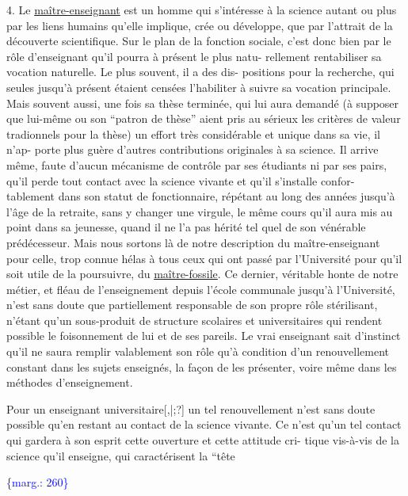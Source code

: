 \documentclass[11pt]{article}
\newcommand{\scanpage}[1]{\par\bigskip\noindent{\small\sffamily[scan #1]}\par}
\newcommand{\mspage}[1]{{\small\sffamily[p.\,#1]}}
\newcommand{\margin}[1]{\textcolor{blue}{\{\textsf{marg.:} #1\}}}
\newcommand{\uline}[1]{\underline{#1}}
\newcommand{\unsure}[1]{[#1?]}
\begin{document}
4.  Le \uline{maître-enseignant} est un homme qui s'intéresse à la science autant ou
plus par les liens humains qu'elle implique, crée ou développe, que par
l'attrait de la découverte scientifique. Sur le plan de la fonction sociale,
c'est donc bien par le rôle d'enseignant qu'il pourra à présent le plus natu-%
rellement rentabiliser sa vocation naturelle. Le plus souvent, il a des dis-%
positions pour la recherche, qui seules jusqu'à présent étaient censées
l'habiliter à suivre sa vocation principale. Mais souvent aussi, une fois sa
thèse terminée, qui lui aura demandé (à supposer que lui-même ou son
``patron de thèse'' aient pris au sérieux les critères de valeur tradionnels
pour la thèse) un effort très considérable et unique dans sa vie, il n'ap-%
porte plus guère d'autres contributions originales à sa science. Il arrive
même, faute d'aucun mécanisme de contrôle par ses étudiants ni par ses pairs,
qu'il perde tout contact avec la science vivante et qu'il s'installe confor-%
tablement dans son statut de fonctionnaire, répétant au long des années
jusqu'à l'âge de la retraite, sans y changer une virgule, le même cours qu'il
aura mis au point dans sa jeunesse, quand il ne l'a pas hérité tel quel
de son vénérable prédécesseur. Mais nous sortons là de notre description du
maître-enseignant pour celle, trop connue hélas à tous ceux qui ont passé
par l'Université pour qu'il soit utile de la poursuivre, du \uline{maître-fossile}.
Ce dernier, véritable honte de notre métier, et fléau de l'enseignement depuis
l'école communale jusqu'à l'Université, n'est sans doute que partiellement
responsable de son propre rôle stérilisant, n'étant qu'un sous-produit de
structure scolaires et universitaires qui rendent possible le foisonnement de
lui et de ses pareils. Le vrai enseignant sait d'instinct qu'il ne saura
remplir valablement son rôle qu'à condition d'un renouvellement constant dans
les sujets enseignés, la façon de les présenter, voire même dans les méthodes
d'enseignement.

\qquad Pour un enseignant universitaire\unsure{,|;} un tel renouvellement n'est sans
doute possible qu'en restant au contact de la science vivante. Ce n'est qu'un
tel contact qui gardera à son esprit cette ouverture et cette attitude cri-%
tique vis-à-vis de la science qu'il enseigne, qui caractérisent la ``tête

\margin{260}

\clearpage
\scanpage{119/261}
\mspage{8}
\end{document}
